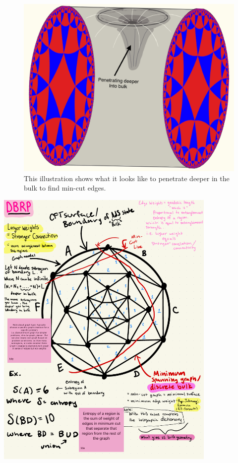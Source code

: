 \documentclass[12pt]{article}
\begin{document}
\begin{figure}[htbp]
    \centering
    \includegraphics[width=\textwidth]{deeper.jpeg}  
    \caption{This illustration shows what it looks like to penetrate deeper in the bulk to find min-cut edges.}  
    \label{fig:penetrating bulk}  
\end{figure}

\newpage

\begin{center}
    \includegraphics[width=0.8\textwidth]{dbrp_summed.pdf}
\end{center}
\end{document}
